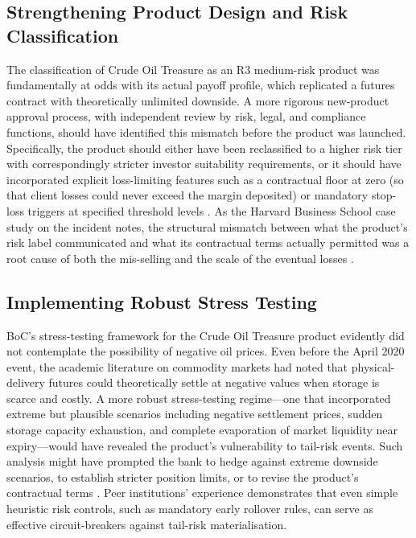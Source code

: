 \documentclass[a4paper,11pt]{article}
\begin{document}
\subsection{Strengthening Product Design and Risk Classification}

The classification of Crude Oil Treasure as an R3 medium-risk product
was fundamentally at odds with its actual payoff profile, which
replicated a futures contract with theoretically unlimited downside.
A more rigorous new-product approval process, with independent review
by risk, legal, and compliance functions, should have identified this
mismatch before the product was launched. Specifically, the product
should either have been reclassified to a higher risk tier with
correspondingly stricter investor suitability requirements, or it
should have incorporated explicit loss-limiting features such as a
contractual floor at zero (so that client losses could never exceed
the margin deposited) or mandatory stop-loss triggers at specified
threshold levels \cite{scmp2020billion}. As the Harvard Business
School case study on the incident notes, the structural mismatch
between what the product's risk label communicated and what its
contractual terms actually permitted was a root cause of both the
mis-selling and the scale of the eventual losses \cite{hbs2020structured}.

\subsection{Implementing Robust Stress Testing}

BoC's stress-testing framework for the Crude Oil Treasure product
evidently did not contemplate the possibility of negative oil prices.
Even before the April 2020 event, the academic literature on
commodity markets had noted that physical-delivery futures could
theoretically settle at negative values when storage is scarce and
costly. A more robust stress-testing regime---one that incorporated
extreme but plausible scenarios including negative settlement prices,
sudden storage capacity exhaustion, and complete evaporation of
market liquidity near expiry---would have revealed the product's
vulnerability to tail-risk events. Such analysis might have prompted
the bank to hedge against extreme downside scenarios, to establish
stricter position limits, or to revise the product's contractual
terms \cite{atlantis2021fmet}. Peer institutions' experience
demonstrates that even simple heuristic risk controls, such as
mandatory early rollover rules, can serve as effective
circuit-breakers against tail-risk materialisation.
\end{document}
